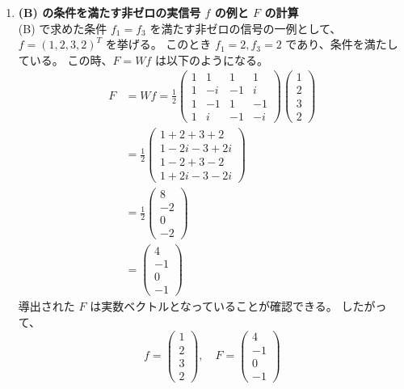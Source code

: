 \documentclass[11pt,a4paper]{jlreq}
\begin{document}
\begin{enumerate}
    \item[(C)] \textbf{\boldmath (B) の条件を満たす非ゼロの実信号 \boldmath $f$ の例と \boldmath $F$ の計算} \\
    (B) で求めた条件 $f_1 = f_3$ を満たす非ゼロの信号の一例として、$f = (1, 2, 3, 2)^T$ を挙げる。
    このとき $f_1 = 2, f_3 = 2$ であり、条件を満たしている。
    \noindent
    この時、$F = Wf$ は以下のようになる。
    \begin{align*}
        F &= Wf = \frac{1}{2} \begin{pmatrix} 1 & 1 & 1 & 1 \\ 1 & -i & -1 & i \\ 1 & -1 & 1 & -1 \\ 1 & i & -1 & -i \end{pmatrix} \begin{pmatrix} 1 \\ 2 \\ 3 \\ 2 \end{pmatrix} \\
        &= \frac{1}{2} \begin{pmatrix} 1 + 2 + 3 + 2 \\ 1 - 2i - 3 + 2i \\ 1 - 2 + 3 - 2 \\ 1 + 2i - 3 - 2i \end{pmatrix} \\
        &= \frac{1}{2} \begin{pmatrix} 8 \\ -2 \\ 0 \\ -2 \end{pmatrix} \\
        &= \begin{pmatrix} 4 \\ -1 \\ 0 \\ -1 \end{pmatrix}
    \end{align*}
    導出された $F$ は実数ベクトルとなっていることが確認できる。
    したがって、
    \[
        \boxed{ f = \begin{pmatrix} 1 \\ 2 \\ 3 \\ 2 \end{pmatrix}, \quad F = \begin{pmatrix} 4 \\ -1 \\ 0 \\ -1 \end{pmatrix} }
    \]
\end{enumerate}
\end{document}
